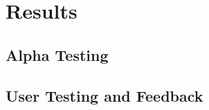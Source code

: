 \chapter{Results}
\label{chapter3}

\section{Alpha Testing}






\section{User Testing and Feedback}
